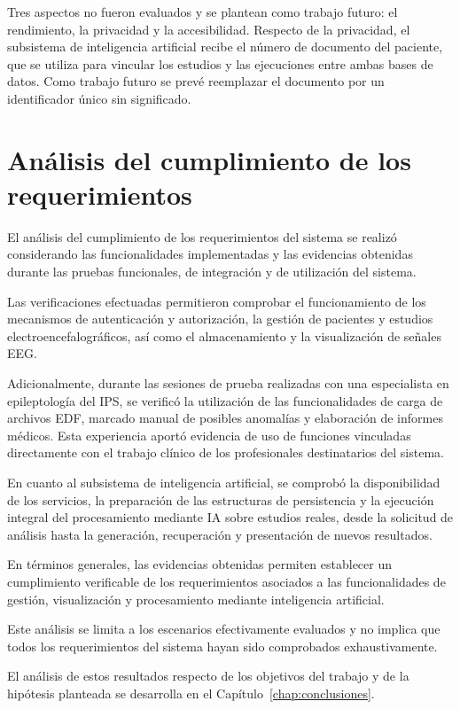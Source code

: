 Tres aspectos no fueron evaluados y se plantean como trabajo futuro: el rendimiento, la privacidad y la accesibilidad.
Respecto de la privacidad, el subsistema de inteligencia artificial recibe el número de documento del paciente, que se utiliza para vincular los estudios y las ejecuciones entre ambas bases de datos.
Como trabajo futuro se prevé reemplazar el documento por un identificador único sin significado.

\section[Análisis del cumplimiento de los requerimientos]{Análisis del cumplimiento de los \\requerimientos}

El análisis del cumplimiento de los requerimientos
del sistema se realizó considerando las
funcionalidades implementadas y las evidencias
obtenidas durante las pruebas funcionales,
de integración y de utilización del sistema.

Las verificaciones efectuadas permitieron
comprobar el funcionamiento de los mecanismos
de autenticación y autorización, la gestión
de pacientes y estudios electroencefalográficos,
así como el almacenamiento y la visualización
de señales EEG.

Adicionalmente, durante las sesiones de prueba
realizadas con una especialista en epileptología
del IPS, se verificó la utilización de las
funcionalidades de carga de archivos EDF,
marcado manual de posibles anomalías y
elaboración de informes médicos. Esta
experiencia aportó evidencia de uso de
funciones vinculadas directamente con el
trabajo clínico de los profesionales
destinatarios del sistema.

En cuanto al subsistema de inteligencia artificial, se comprobó la disponibilidad de los servicios, la preparación de las estructuras de persistencia y la ejecución integral del procesamiento mediante IA sobre estudios reales, desde la solicitud de análisis hasta la generación, recuperación y presentación de nuevos resultados.

En términos generales, las evidencias obtenidas permiten establecer un cumplimiento verificable de los requerimientos asociados a las funcionalidades de gestión, visualización y procesamiento mediante inteligencia artificial.

Este análisis se limita a los escenarios
efectivamente evaluados y no implica que
todos los requerimientos del sistema hayan
sido comprobados exhaustivamente.

\begin{nuevotexto}
El análisis de estos resultados respecto de los objetivos del trabajo y de la hipótesis planteada se desarrolla en el Capítulo~\ref{chap:conclusiones}.
\end{nuevotexto}
